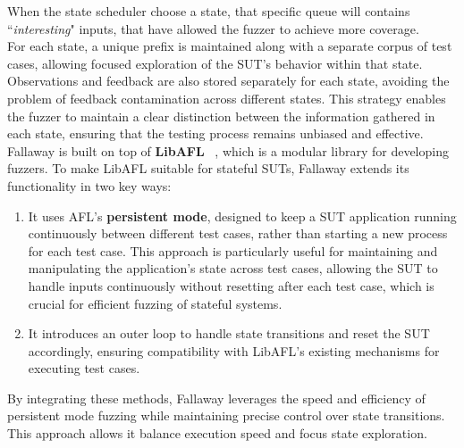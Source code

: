 When the state scheduler choose a state, that specific queue will contains ``\textit{interesting}" inputs, that have allowed the fuzzer to achieve more coverage.
\\For each state, a unique prefix is maintained along with a separate corpus of test cases, allowing focused exploration of the SUT's behavior within that state. Observations and feedback are also stored separately for each state, avoiding the problem of feedback contamination across different states. This strategy enables the fuzzer to maintain a clear distinction between the information gathered in each state, ensuring that the testing process remains unbiased and effective.
\\Fallaway is built on top of \textbf{LibAFL} ~\cite{libafl}, which is a modular library for developing fuzzers. To make LibAFL suitable for stateful SUTs, Fallaway extends its functionality in two key ways:
\begin{enumerate}
    \item It uses AFL's \textbf{persistent mode}, designed to keep a SUT application running continuously between different test cases, rather than starting a new process for each test case. This approach is particularly useful for maintaining and manipulating the application's state across test cases, allowing the SUT to handle inputs continuously without resetting after each test case, which is crucial for efficient fuzzing of stateful systems.
    \item It introduces an outer loop to handle state transitions and reset the SUT accordingly, ensuring compatibility with LibAFL's existing mechanisms for executing test cases.
\end{enumerate}  
By integrating these methods, Fallaway leverages the speed and efficiency of persistent mode fuzzing while maintaining precise control over state transitions. This approach allows it balance execution speed and focus state exploration.
